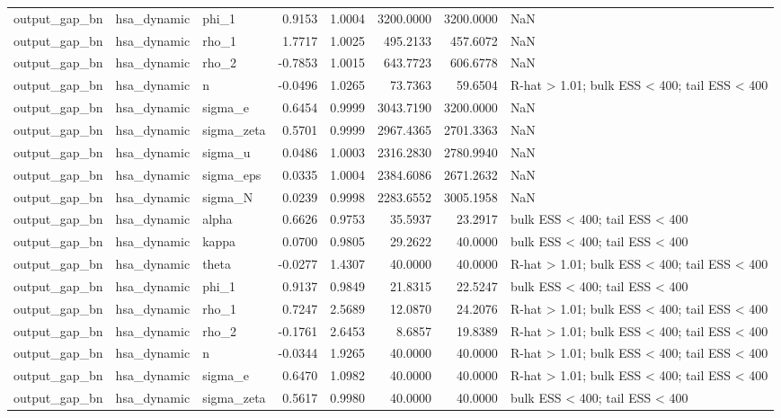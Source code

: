 \begin{tabular}{lllrrrrl}
output\_gap\_bn & hsa\_dynamic & phi\_1 & 0.9153 & 1.0004 & 3200.0000 & 3200.0000 & NaN \\
output\_gap\_bn & hsa\_dynamic & rho\_1 & 1.7717 & 1.0025 & 495.2133 & 457.6072 & NaN \\
output\_gap\_bn & hsa\_dynamic & rho\_2 & -0.7853 & 1.0015 & 643.7723 & 606.6778 & NaN \\
output\_gap\_bn & hsa\_dynamic & n & -0.0496 & 1.0265 & 73.7363 & 59.6504 & R-hat > 1.01; bulk ESS < 400; tail ESS < 400 \\
output\_gap\_bn & hsa\_dynamic & sigma\_e & 0.6454 & 0.9999 & 3043.7190 & 3200.0000 & NaN \\
output\_gap\_bn & hsa\_dynamic & sigma\_zeta & 0.5701 & 0.9999 & 2967.4365 & 2701.3363 & NaN \\
output\_gap\_bn & hsa\_dynamic & sigma\_u & 0.0486 & 1.0003 & 2316.2830 & 2780.9940 & NaN \\
output\_gap\_bn & hsa\_dynamic & sigma\_eps & 0.0335 & 1.0004 & 2384.6086 & 2671.2632 & NaN \\
output\_gap\_bn & hsa\_dynamic & sigma\_N & 0.0239 & 0.9998 & 2283.6552 & 3005.1958 & NaN \\
output\_gap\_bn & hsa\_dynamic & alpha & 0.6626 & 0.9753 & 35.5937 & 23.2917 & bulk ESS < 400; tail ESS < 400 \\
output\_gap\_bn & hsa\_dynamic & kappa & 0.0700 & 0.9805 & 29.2622 & 40.0000 & bulk ESS < 400; tail ESS < 400 \\
output\_gap\_bn & hsa\_dynamic & theta & -0.0277 & 1.4307 & 40.0000 & 40.0000 & R-hat > 1.01; bulk ESS < 400; tail ESS < 400 \\
output\_gap\_bn & hsa\_dynamic & phi\_1 & 0.9137 & 0.9849 & 21.8315 & 22.5247 & bulk ESS < 400; tail ESS < 400 \\
output\_gap\_bn & hsa\_dynamic & rho\_1 & 0.7247 & 2.5689 & 12.0870 & 24.2076 & R-hat > 1.01; bulk ESS < 400; tail ESS < 400 \\
output\_gap\_bn & hsa\_dynamic & rho\_2 & -0.1761 & 2.6453 & 8.6857 & 19.8389 & R-hat > 1.01; bulk ESS < 400; tail ESS < 400 \\
output\_gap\_bn & hsa\_dynamic & n & -0.0344 & 1.9265 & 40.0000 & 40.0000 & R-hat > 1.01; bulk ESS < 400; tail ESS < 400 \\
output\_gap\_bn & hsa\_dynamic & sigma\_e & 0.6470 & 1.0982 & 40.0000 & 40.0000 & R-hat > 1.01; bulk ESS < 400; tail ESS < 400 \\
output\_gap\_bn & hsa\_dynamic & sigma\_zeta & 0.5617 & 0.9980 & 40.0000 & 40.0000 & bulk ESS < 400; tail ESS < 400 \\

\end{tabular}
